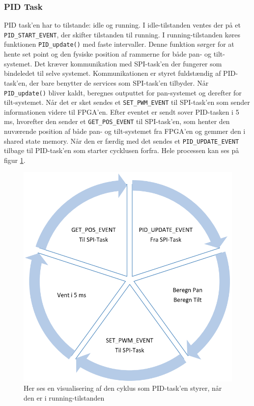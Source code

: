 \subsubsection{PID Task}

PID task'en har to tilstande: idle og running. I idle-tilstanden ventes der på et \texttt{PID\_START\_EVENT}, der skifter tilstanden til running. I running-tilstanden køres funktionen \texttt{PID\_update()} med faste intervaller. Denne funktion sørger for at hente set point og den fysiske position af rammerne for både pan- og tilt-systemet. Det kræver kommunikation med SPI-task'en der fungerer som bindeledet til selve systemet. Kommunikationen er styret fuldstændig af PID-task'en, der bare benytter de services som SPI-task'en tilbyder. Når \texttt{PID\_update()} bliver kaldt, beregnes outputtet for pan-systemet og derefter for tilt-systemet. Når det er sket sendes et \texttt{SET\_PWM\_EVENT} til SPI-task'en som sender informationen videre til FPGA'en. Efter eventet er sendt sover PID-tasken i 5 ms, hvorefter den sender et \texttt{GET\_POS\_EVENT} til SPI-task'en, som henter den nuværende position af både pan- og tilt-systemet fra FPGA'en og gemmer den i shared state memory. Når den er færdig med det sendes et \texttt{PID\_UPDATE\_EVENT} tilbage til PID-task'en som starter cycklusen forfra. Hele processen kan ses på figur \ref{fig:PID_update}.

\begin{figure}[ht]
	\begin{center}
	\includegraphics[scale=0.5]{Billeder/PID_update.png}
	\end{center}		
	\caption{Her ses en visualisering af den cyklus som PID-task'en styrer, når den er i running-tilstanden}
	\label{fig:PID_update}
\end{figure}

